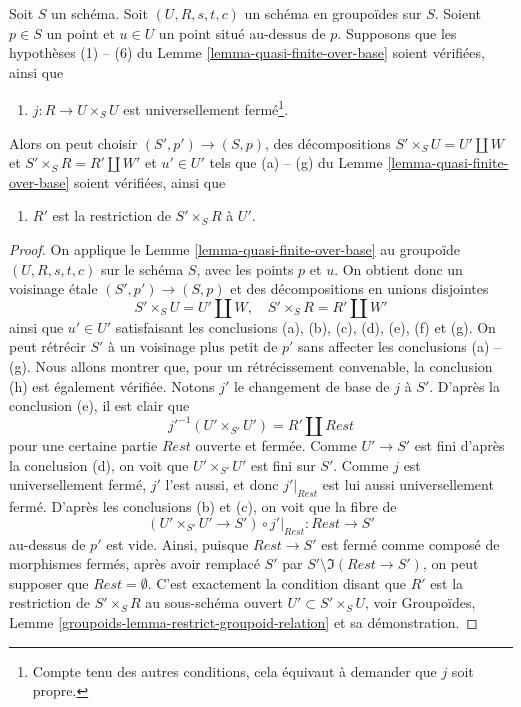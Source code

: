 \begin{lemma}
\label{lemma-quasi-finite-over-base-j-proper}
Soit $S$ un schéma.
Soit $(U, R, s, t, c)$ un schéma en groupoïdes sur $S$.
Soient $p \in S$ un point et $u \in U$ un point situé au-dessus de $p$.
Supposons que les hypothèses (1) -- (6) du
Lemme \ref{lemma-quasi-finite-over-base}
soient vérifiées, ainsi que
\begin{enumerate}
\item[(7)] $j : R \to U \times_S U$ est universellement fermé\footnote{Compte tenu
des autres conditions, cela équivaut à demander que $j$ soit propre.}.
\end{enumerate}
Alors on peut choisir $(S', p') \to (S, p)$, des décompositions
$S' \times_S U = U' \amalg W$ et $S' \times_S R = R' \amalg W'$
et $u' \in U'$ tels que (a) -- (g) du
Lemme \ref{lemma-quasi-finite-over-base}
soient vérifiées, ainsi que
\begin{enumerate}
\item[(h)] $R'$ est la restriction de $S' \times_S R$ à $U'$.
\end{enumerate}
\end{lemma}

\begin{proof}
On applique le Lemme \ref{lemma-quasi-finite-over-base} au
groupoïde $(U, R, s, t, c)$ sur le schéma $S$, avec les points $p$ et $u$.
On obtient donc un voisinage \'etale
$(S', p') \to (S, p)$ et des décompositions en unions disjointes
$$
S' \times_S U = U' \amalg W, \quad
S' \times_S R = R' \amalg W'
$$
ainsi que $u' \in U'$ satisfaisant les conclusions (a), (b), (c), (d), (e), (f) et (g).
On peut rétrécir $S'$ à un voisinage plus petit de $p'$ sans
affecter les conclusions (a) -- (g). Nous allons montrer que, pour un
rétrécissement convenable, la conclusion (h) est également vérifiée.
Notons $j'$ le changement de base de $j$ à $S'$.
D'après la conclusion (e), il est clair que
$$
j'^{-1}(U' \times_{S'} U') = R' \amalg Rest
$$
pour une certaine partie $Rest$ ouverte et fermée. Comme $U' \to S'$ est fini
d'après la conclusion (d), on voit que $U' \times_{S'} U'$ est fini sur $S'$.
Comme $j$ est universellement fermé, $j'$ l'est aussi, et
donc $j'|_{Rest}$ est lui aussi universellement fermé. D'après les conclusions
(b) et (c), on voit que la fibre de
$$
(U' \times_{S'} U' \to S') \circ j'|_{Rest} :
Rest
\longrightarrow
S'
$$
au-dessus de $p'$ est vide. Ainsi, puisque $Rest \to S'$ est fermé comme composé
de morphismes fermés, après avoir remplacé $S'$ par
$S' \setminus \Im(Rest \to S')$, on peut supposer que
$Rest = \emptyset$. C'est exactement la condition disant que $R'$ est
la restriction de $S' \times_S R$ au sous-schéma ouvert
$U' \subset S' \times_S U$, voir
Groupoïdes, Lemme \ref{groupoids-lemma-restrict-groupoid-relation}
et sa démonstration.
\end{proof}






